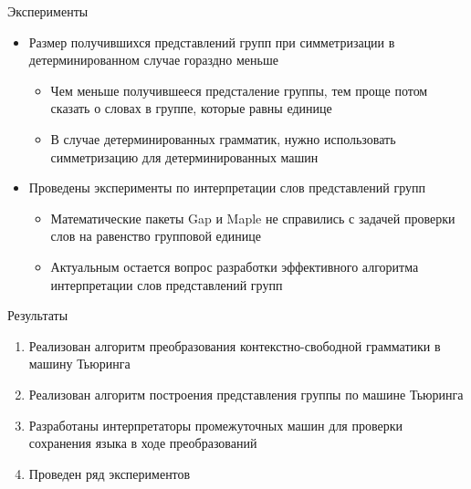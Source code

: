 \documentclass[xcolor=table]{beamer}
\begin{document}
\begin{frame}[fragile]{Эксперименты}
    \begin{itemize}
    \item Размер получившихся представлений групп при симметризации в детерминированном случае гораздно меньше
    \begin{itemize}
        \item Чем меньше получившееся предсталение группы, тем проще потом сказать о словах в группе, которые равны единице
        \item В случае детерминированных грамматик, нужно использовать симметризацию для детерминированных машин
    \end{itemize}
    \item Проведены эксперименты по интерпретации слов представлений групп
    \begin{itemize}
        \item Математические пакеты Gap и Maple не справились с задачей проверки слов на равенство групповой единице
        \item Актуальным остается вопрос разработки эффективного алгоритма интерпретации слов представлений групп
    \end{itemize}
    \end{itemize}
\end{frame}

\begin{frame}[fragile]{Результаты}
    \begin{enumerate}
    \item Реализован алгоритм преобразования контекстно-свободной грамматики в машину Тьюринга
    \item Реализован алгоритм построения представления группы по машине Тьюринга
    \item Разработаны интерпретаторы промежуточных машин для проверки сохранения языка в ходе преобразований
    \item Проведен ряд экспериментов
\end{enumerate}
\end{frame}
\end{document}
